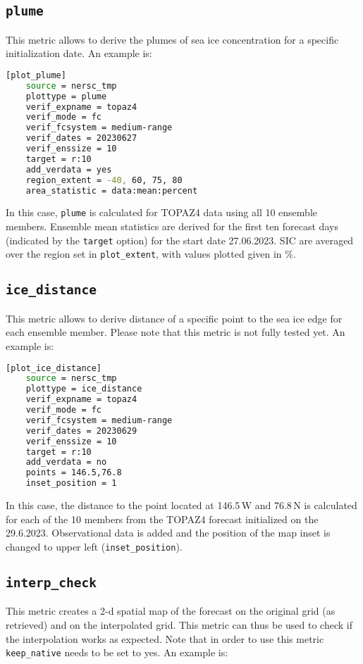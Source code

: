 \documentclass[DIV=10, parskip=full]{scrreprt}
\newcommand{\notimplement}[1]{#1}
\begin{document}
\subsection{\texttt{plume}}
This metric allows to derive the plumes of  sea ice concentration for a specific initialization date. An example is:

\begin{lstlisting}[language=bash, float]
	[plot_plume]
	source = nersc_tmp   
	plottype = plume 
	verif_expname = topaz4 
	verif_mode = fc
	verif_fcsystem = medium-range
	verif_dates = 20230627
	verif_enssize = 10
	target = r:10
	add_verdata = yes
	region_extent = -40, 60, 75, 80
	area_statistic = data:mean:percent
\end{lstlisting}

In this case, \texttt{plume} is calculated for TOPAZ4 data using all 10 ensemble members. Ensemble mean statistics are derived for the first ten forecast days (indicated by the \texttt{target} option) for the start date 27.06.2023. SIC are averaged over the region set in \texttt{plot\_extent}, with values plotted given in \%.

\subsection{\texttt{ice\_distance}}
This metric allows to derive distance of a specific point to the sea ice edge for each ensemble member. \notimplement{Please note that this metric is not fully tested yet. An example is}:

\begin{lstlisting}[language=bash, float]
	[plot_ice_distance]
	source = nersc_tmp
	plottype = ice_distance
	verif_expname = topaz4
	verif_mode = fc
	verif_fcsystem = medium-range
	verif_dates = 20230629
	verif_enssize = 10
	target = r:10
	add_verdata = no
	points = 146.5,76.8
	inset_position = 1
\end{lstlisting}

In this case, the distance to the point located at 146.5\,W and 76.8\,N is calculated for each of the 10 members from the TOPAZ4 forecast initialized on the 29.6.2023. Observational data is added and the position of the map inset is changed to upper left (\texttt{inset\_position}).


\subsection{\texttt{interp\_check}}
This metric creates a 2-d spatial map of the forecast on the original grid (as retrieved) and on the interpolated grid. This metric can thus be used to check if the interpolation works as expected. Note that in order to use this metric \texttt{keep\_native} needs to be set to yes. An example is:
\end{document}

